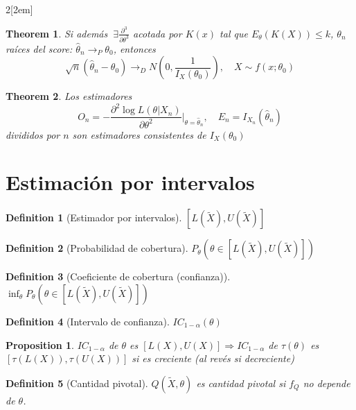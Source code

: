 \documentclass[leqno]{article}
\newtheorem*{theorem}{Theorem}
\newtheorem*{proposition}{Proposition}
\newtheorem*{definition}{Definition}
\begin{document}
\begin{multicols}{2}[\columnsep2em]
\begin{theorem} Si además $\ \exists \frac{\partial^3}{\partial \theta ^3}$ acotada por $K(x)$ tal que  $E_\theta (K(X))\le k$, $\theta_n$ raíces del score: $\hat{\theta }_n \to _P \theta _0$, entonces
  \[
  \sqrt{n}(\hat{\theta }_n-\theta_0) \to _D N(0, \frac{1}{I_X(\theta _0)}), \quad X \sim  f(x;\theta _0)
  \] 
\end{theorem}

\begin{theorem} Los estimadores
  \[
  O_n = -\frac{\partial^2 \log L(\theta | X_n)}{\partial\theta ^2}|_{\theta =\hat{\theta }_n}, \quad E_n = I_{X_n}(\hat{\theta }_n) 
  \] 
  divididos por $n$ son estimadores consistentes de  $I_X(\theta _0)$

\end{theorem}







\section{Estimación por intervalos}

\begin{definition}[Estimador por intervalos] $[L(\tilde{X}), U(\tilde{X})]$
\end{definition}

\begin{definition}[Probabilidad de cobertura]
$P_\theta(\theta \in [L(\tilde{X}), U(\tilde{X})])$
\end{definition}

\begin{definition}[Coeficiente de cobertura (confianza)] 
$\inf_{\theta }P_\theta(\theta \in [L(\tilde{X}), U(\tilde{X})])$
\end{definition}

\begin{definition}[Intervalo de confianza] $IC_{1-\alpha }(\theta)$
\end{definition}

\begin{proposition} 
  $IC_{1-\alpha }$ de $\theta$ es $[L(X), U(X)] \Rightarrow IC_{1-\alpha}$ de $\tau (\theta )$ es $[\tau (L(X)), \tau(U(X))]$ si es creciente (al revés si decreciente)
\end{proposition}

\begin{definition}[Cantidad pivotal] $Q(\tilde{X}, \theta )$ es cantidad pivotal si $f_Q$ no depende de  $\theta $.


\end{definition}
\end{multicols}
\end{document}
